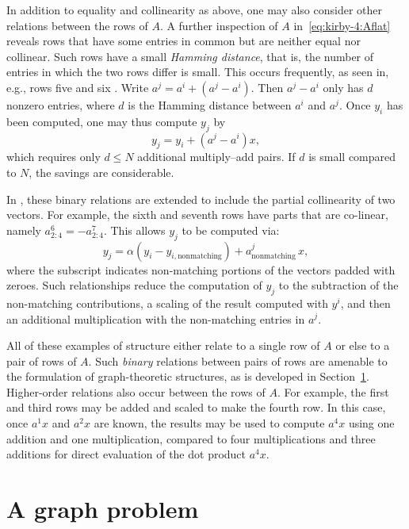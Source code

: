 In addition to equality and collinearity as above, one may also
consider other relations between the rows of $A$. A further inspection
of $A$ in~\eqref{eq:kirby-4:Aflat} reveals rows that have some entries
in common but are neither equal nor collinear. Such rows have a small
\emph{Hamming distance}, that is, the number of entries in which the
two rows differ is small. This occurs frequently, as seen in, e.g.,
rows five and six . Write $ a^j = a^i + (a^j-a^i) $. Then $ a^j -a^i $
only has $ d $ nonzero entries, where $d$ is the Hamming distance
between $a^i$ and $a^j$.  Once $ y_i $ has been computed, one may thus
compute $y_j$ by
\begin{equation}
y_j = y_i + \left( a^j - a^i \right) x,
\end{equation}
which requires only $ d \leqslant N $ additional multiply--add pairs. If
$ d $ is small compared to $ N $, the savings are considerable.

In \citet{WolfHeath2009}, these binary relations are extended to
include the partial collinearity of two vectors.  For example, the
sixth and seventh rows have parts that are co-linear, namely
$a^6_{2:4} = - a^7_{2:4}$.  This allows $y_j$ to be computed via:
\begin{equation}
  y_j = \alpha(y_i - y_{i,\mathrm{nonmatching}}) + a^j_{\mathrm{nonmatching}} \, x,
\end{equation}
where the subscript indicates non-matching portions of the vectors
padded with zeroes. Such relationships reduce the computation of $y_j$
to the subtraction of the non-matching contributions, a scaling of the
result computed with $y^i$, and then an additional multiplication with
the non-matching entries in $a^j$.

All of these examples of structure either relate to a single row of $
A $ or else to a pair of rows of $ A $. Such \emph{binary} relations
between pairs of rows are amenable to the formulation of
graph-theoretic structures, as is developed in
Section~\ref{sec:kirby-4:graph}. Higher-order relations also occur
between the rows of $ A $.  For example, the first and third rows may
be added and scaled to make the fourth row.  In this case, once $ a^1
x $ and $ a^2 x $ are known, the results may be used to compute $
a^{4} x $ using one addition and one multiplication, compared to four
multiplications and three additions for direct evaluation of the dot
product $a^{4} x$.

\section{A graph problem}
\label{sec:kirby-4:graph}

